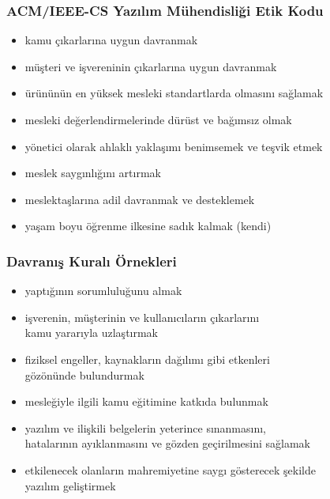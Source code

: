 \documentclass[dvipsnames]{beamer}
\theoremstyle{plain}
\begin{document}
\begin{frame}
  \frametitle{ACM/IEEE-CS Yazılım Mühendisliği Etik Kodu}

  \begin{itemize}
    \item \alert{kamu} çıkarlarına uygun davranmak
    \item \alert{müşteri ve işveren}inin çıkarlarına uygun davranmak
    \item \alert{ürün}ünün en yüksek mesleki standartlarda olmasını sağlamak
    \item mesleki \alert{değerlendirme}lerinde dürüst ve bağımsız olmak
    \item \alert{yönetici} olarak ahlaklı yaklaşımı benimsemek ve teşvik etmek
    \item \alert{meslek} saygınlığını artırmak
    \item \alert{meslektaş}larına adil davranmak ve desteklemek
    \item yaşam boyu öğrenme ilkesine sadık kalmak (\alert{kendi})
  \end{itemize}
\end{frame}

\begin{frame}
  \frametitle{Davranış Kuralı Örnekleri}

  \begin{itemize}
    \item yaptığının sorumluluğunu almak
    \item işverenin, müşterinin ve kullanıcıların çıkarlarını\\
      kamu yararıyla uzlaştırmak
    \item fiziksel engeller, kaynakların dağılımı gibi etkenleri\\
      gözönünde bulundurmak
    \item mesleğiyle ilgili kamu eğitimine katkıda bulunmak
    \item yazılım ve ilişkili belgelerin yeterince sınanmasını,\\
      hatalarının ayıklanmasını ve gözden geçirilmesini sağlamak
    \item etkilenecek olanların mahremiyetine saygı gösterecek şekilde\\
      yazılım geliştirmek
  \end{itemize}
\end{frame}
\end{document}
